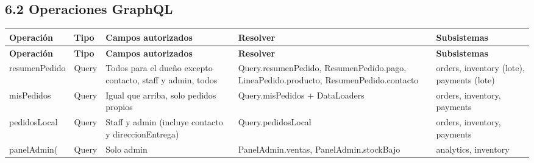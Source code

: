 \documentclass[10pt,letterpaper]{article}
\begin{document}
\subsection*{6.2 Operaciones GraphQL}
{\footnotesize
\begin{longtable}{|P{\tabcolsep\relax}|P{\tabcolsep\relax}|P{\tabcolsep\relax}|P{\tabcolsep\relax}|P{\tabcolsep\relax}|}
\hline
\textbf{Operación} & \textbf{Tipo} & \textbf{Campos autorizados} & \textbf{Resolver} & \textbf{Subsistemas} \\ \hline
\endfirsthead
\hline
\textbf{Operación} & \textbf{Tipo} & \textbf{Campos autorizados} & \textbf{Resolver} & \textbf{Subsistemas} \\ \hline
\endhead
resumenPedido & Query & Todos para el dueño excepto contacto, staff y admin, todos & Query.\allowbreak{}resumenPedido, ResumenPedido.\allowbreak{}pago, LineaPedido.\allowbreak{}producto, ResumenPedido.\allowbreak{}contacto & orders, inventory (lote), payments (lote) \\ \hline
misPedidos & Query & Igual que arriba, solo pedidos propios & Query.\allowbreak{}misPedidos + DataLoaders & orders, inventory, payments \\ \hline
pedidosLocal & Query & Staff y admin (incluye contacto y direccionEntrega) & Query.\allowbreak{}pedidosLocal & orders, inventory, payments \\ \hline
panelAdmin( & Query & Solo admin & PanelAdmin.\allowbreak{}ventas, PanelAdmin.\allowbreak{}stockBajo & analytics, inventory \\ \hline
\end{longtable}}
\end{document}
